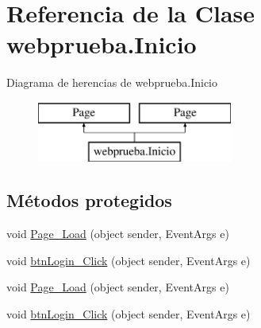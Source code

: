 \hypertarget{classwebprueba_1_1_inicio}{}\section{Referencia de la Clase webprueba.\+Inicio}
\label{classwebprueba_1_1_inicio}
Diagrama de herencias de webprueba.\+Inicio\begin{figure}[H]
\begin{center}
\leavevmode
\includegraphics[height=2.000000cm]{classwebprueba_1_1_inicio}
\end{center}
\end{figure}
\subsection*{Métodos protegidos}
\begin{DoxyCompactItemize}
\item 
void \mbox{\hyperlink{classwebprueba_1_1_inicio_aba96a902e36c94a92c715ac3f5ba09a1}{Page\+\_\+\+Load}} (object sender, Event\+Args e)
\item 
void \mbox{\hyperlink{classwebprueba_1_1_inicio_a1761d28a0d0abc08ad76bc5e9a7c74a0}{btn\+Login\+\_\+\+Click}} (object sender, Event\+Args e)
\item 
void \mbox{\hyperlink{classwebprueba_1_1_inicio_aba96a902e36c94a92c715ac3f5ba09a1}{Page\+\_\+\+Load}} (object sender, Event\+Args e)
\item 
void \mbox{\hyperlink{classwebprueba_1_1_inicio_a1761d28a0d0abc08ad76bc5e9a7c74a0}{btn\+Login\+\_\+\+Click}} (object sender, Event\+Args e)
\end{DoxyCompactItemize}
